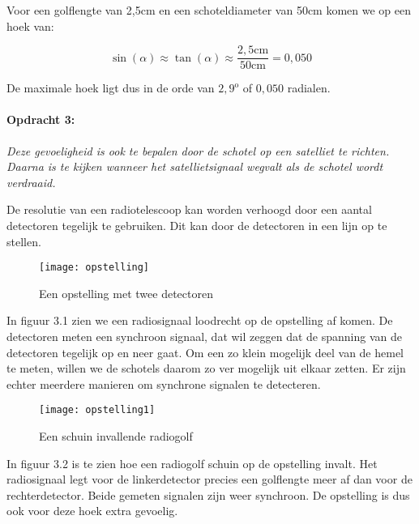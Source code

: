 Voor een golflengte van 2,5cm en een schoteldiameter van 50cm komen
we op een hoek van:

\begin{equation}
\sin(\alpha)\approx \tan(\alpha)\approx\frac{\mathrm{2,5cm}}{50\mathrm{cm}}=0,050
\end{equation}


De maximale hoek ligt dus in de orde van $2,9^{\mathrm{o}}$ of $0,050$
radialen.


\paragraph*{Opdracht 3:}

\emph{Deze gevoeligheid is ook te bepalen door de schotel op een satelliet
te richten. Daarna is te kijken wanneer het satellietsignaal wegvalt
als de schotel wordt verdraaid.}

De resolutie van een radiotelescoop kan worden verhoogd door een aantal
detectoren tegelijk te gebruiken. Dit kan door de detectoren in een
lijn op te stellen.

\begin{figure}[H]
\noindent \begin{centering}
\texttt{[image: opstelling]}
\par\end{centering}

\caption{Een opstelling met twee detectoren}
\end{figure}


In figuur 3.1 zien we een radiosignaal loodrecht op de opstelling
af komen. De detectoren meten een synchroon signaal, dat wil zeggen
dat de spanning van de detectoren tegelijk op en neer gaat. Om een
zo klein mogelijk deel van de hemel te meten, willen we de schotels
daarom zo ver mogelijk uit elkaar zetten. Er zijn echter meerdere
manieren om synchrone signalen te detecteren.

\begin{figure}[H]
\noindent \begin{centering}
\texttt{[image: opstelling1]}
\par\end{centering}

\caption{Een schuin invallende radiogolf}
\end{figure}


In figuur 3.2 is te zien hoe een radiogolf schuin op de opstelling
invalt. Het radiosignaal legt voor de linkerdetector precies een golflengte
meer af dan voor de rechterdetector. Beide gemeten signalen zijn weer
synchroon. De opstelling is dus ook voor deze hoek extra gevoelig. 


